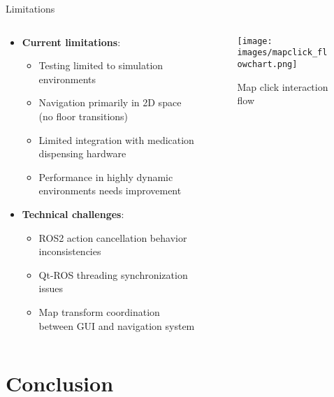 \documentclass[aspectratio=169]{beamer}
\begin{document}
\begin{frame}{Limitations}
	\begin{columns}
		\begin{column}{0.6\textwidth}
			\begin{itemize}
				\item \textbf{Current limitations}:
				      \begin{itemize}
					      \item Testing limited to simulation environments
					      \item Navigation primarily in 2D space (no floor transitions)
					      \item Limited integration with medication dispensing hardware
					      \item Performance in highly dynamic environments needs improvement
				      \end{itemize}
				\item \textbf{Technical challenges}:
				      \begin{itemize}
					      \item ROS2 action cancellation behavior inconsistencies
					      \item Qt-ROS threading synchronization issues
					      \item Map transform coordination between GUI and navigation system
				      \end{itemize}
			\end{itemize}
		\end{column}
		\begin{column}{0.4\textwidth}
			\begin{figure}
				\texttt{[image: images/mapclick\_flowchart.png]}
				\caption{Map click interaction flow}
			\end{figure}
		\end{column}
	\end{columns}
\end{frame}

\section{Conclusion}
\end{document}
